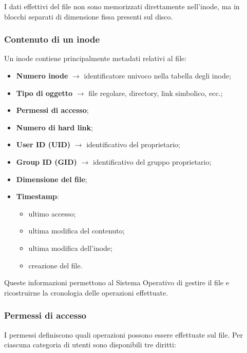 \noindent I dati effettivi del file non sono memorizzati direttamente nell’inode, ma in blocchi separati di dimensione fissa presenti sul disco.

\bigskip

\subsubsection*{Contenuto di un inode}
Un inode contiene principalmente metadati relativi al file:

\begin{itemize}
    \item \textbf{Numero inode} $\rightarrow$ identificatore univoco nella tabella degli inode;
    
    \item \textbf{Tipo di oggetto} $\rightarrow$ file regolare, directory, link simbolico, ecc.;
    
    \item \textbf{Permessi di accesso};
    
    \item \textbf{Numero di hard link};
    
    \item \textbf{User ID (UID)} $\rightarrow$ identificativo del proprietario;
    
    \item \textbf{Group ID (GID)} $\rightarrow$ identificativo del gruppo proprietario;
    
    \item \textbf{Dimensione del file};
    
    \item \textbf{Timestamp}:
    \begin{itemize}
        \item ultimo accesso;
        \item ultima modifica del contenuto;
        \item ultima modifica dell’inode;
        \item creazione del file.
    \end{itemize}
\end{itemize}

\medskip

\noindent Queste informazioni permettono al Sistema Operativo di gestire il file e ricostruirne la cronologia delle operazioni effettuate.

\bigskip

\subsubsection*{Permessi di accesso}
I permessi definiscono quali operazioni possono essere effettuate sul file.
Per ciascuna categoria di utenti sono disponibili tre diritti:

